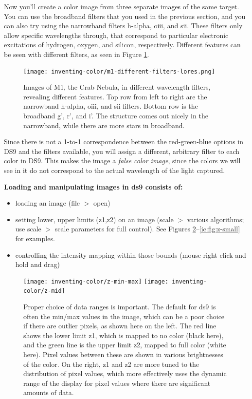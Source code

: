 Now you'll create a color image from three separate images of the same target.
You can use the broadband filters that you used in the previous section, and
you can also try using the narrowband filters h-alpha, oiii, and sii. These
filters only allow specific wavelengths through, that correspond to particular
electronic excitations of hydrogen, oxygen, and silicon, respectively.
Different features can be seen with different filters, as seen in Figure
\ref{ic:fig:m1-filters}.

\begin{figure}
\centering
\texttt{[image: inventing-color/m1-different-filters-lores.png]}
\caption{Images of M1, the Crab Nebula, in different wavelength
filters, revealing different features. Top row from left to right are the
narrowband h-alpha, oiii, and sii filters. Bottom row is the broadband g', r',
and i'. The structure comes out nicely in the narrowband, while there are more
stars in broadband.}\label{ic:fig:m1-filters}

\end{figure}

Since there is not a 1-to-1 correspondence between the red-green-blue options
in DS9 and the filters available, you will assign a different, arbitrary filter
to each color in DS9. This makes the image a \textit{false color image}, since
the colors we will see in it do not correspond to the actual wavelength of the
light captured.

\textbf{Loading and manipulating images in ds9 consists of:}
\begin{itemize}
\item loading an image  (file $>$ open)
\item setting lower, upper limits (z1,z2) on an image  (scale $>$ various
algorithms; use scale $>$ scale parameters for full control). See Figures
\ref{ic:fig:z-min-max}--\ref{ic:fig:z-small} for examples.
\item controlling the intensity mapping within those bounds (mouse right
click-and-hold and drag)
\end{itemize}

\begin{figure}
\texttt{[image: inventing-color/z-min-max]}
\texttt{[image: inventing-color/z-mid]}
\caption{Proper choice of data ranges is important. The default for ds9
is often the min/max values in the image, which can be a poor choice if there
are outlier pixels, as shown here on the left. The red line shows the lower
limit z1, which is mapped to no color (black here), and the green line is the
upper limit z2, mapped to full color (white here). Pixel values between these
are shown in various brightnesses of the color. On the right, z1 and z2 are
more tuned to the distribution of pixel values, which more effectively uses the
dynamic range of the display for pixel values where there are significant
amounts of data.}
\label{ic:fig:z-min-max}
\end{figure}

